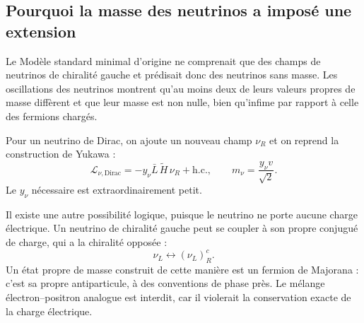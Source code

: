 \subsection{Pourquoi la masse des neutrinos a imposé une extension}

Le Modèle standard minimal d’origine ne comprenait que des champs de neutrinos de chiralité gauche et prédisait donc des neutrinos sans masse. Les oscillations des neutrinos montrent qu’au moins deux de leurs valeurs propres de masse diffèrent et que leur masse est non nulle, bien qu’infime par rapport à celle des fermions chargés.

\begin{classroomqa}\end{classroomqa}

Pour un neutrino de Dirac, on ajoute un nouveau champ \(\nu_R\) et on reprend la construction de Yukawa : \begin{equation}
  \mathcal L_{\nu,\mathrm{Dirac}}
  =-y_\nu\bar L\,\widetilde H\,\nu_R+\mathrm{h.c.},
  \qquad
  m_\nu=\frac{y_\nu v}{\sqrt2}.
  \label{eq:l09-dirac-neutrino}
\end{equation}Le \(y_\nu\) nécessaire est extraordinairement petit.

Il existe une autre possibilité logique, puisque le neutrino ne porte aucune charge électrique. Un neutrino de chiralité gauche peut se coupler à son propre conjugué de charge, qui a la chiralité opposée :
\begin{equation}
  \nu_L\longleftrightarrow(\nu_L)^c_R .
  \label{eq:l09-majorana-mixing}
\end{equation}
Un état propre de masse construit de cette manière est un fermion de Majorana : c’est sa propre antiparticule, à des conventions de phase près. Le mélange électron--positron analogue est interdit, car il violerait la conservation exacte de la charge électrique.

\begin{classroomqa}
\end{classroomqa}

